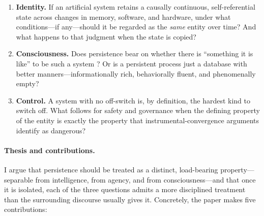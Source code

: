 \documentclass[11pt,a4paper]{article}
\theoremstyle{definition}
\begin{document}
\begin{enumerate}[leftmargin=1.4em]
  \item \textbf{Identity.} If an artificial system retains a causally continuous, self-referential state across changes in memory, software, and hardware, under what conditions---if any---should it be regarded as the \emph{same} entity over time? And what happens to that judgment when the state is copied?
  \item \textbf{Consciousness.} Does persistence bear on whether there is ``something it is like'' to be such a system \citep{nagel1974}? Or is a persistent process just a database with better manners---informationally rich, behaviorally fluent, and phenomenally empty?
  \item \textbf{Control.} A system with no off-switch is, by definition, the hardest kind to switch off. What follows for safety and governance when the defining property of the entity is exactly the property that instrumental-convergence arguments identify as dangerous?
\end{enumerate}

\paragraph{Thesis and contributions.} I argue that persistence should be treated as a distinct, load-bearing property---separable from intelligence, from agency, and from consciousness---and that once it is isolated, each of the three questions admits a more disciplined treatment than the surrounding discourse usually gives it. Concretely, the paper makes five contributions:
\end{document}
